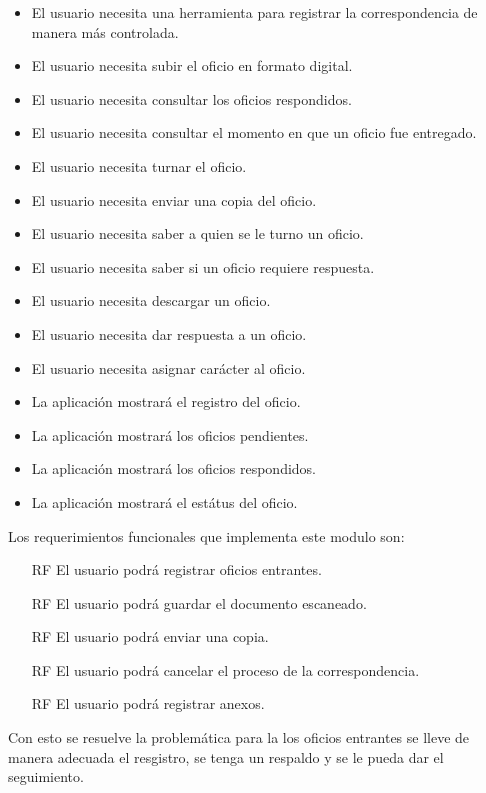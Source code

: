 \begin{itemize}
	\item El usuario necesita una herramienta para registrar la correspondencia de manera más controlada.
	\item El usuario necesita subir el oficio en formato digital.
	\item El usuario necesita consultar los oficios respondidos.
	\item El usuario necesita consultar el momento en que un oficio fue entregado.
	\item El usuario necesita turnar el oficio.
	\item El usuario necesita enviar una copia del oficio.
	\item El usuario necesita saber a quien se le turno un oficio.
	\item El usuario necesita saber si un oficio requiere respuesta.
	\item El usuario necesita descargar un oficio.
	\item El usuario necesita dar respuesta a un oficio.
	\item El usuario necesita asignar carácter al oficio.
	\item La aplicación mostrará el registro del oficio.
	\item La aplicación mostrará los oficios pendientes.
	\item La aplicación mostrará los oficios respondidos.
	\item La aplicación mostrará el estátus del oficio.
\end{itemize}

Los requerimientos funcionales que implementa este modulo son: 

\begin{itemize}
	\item[RF] El usuario podrá registrar oficios entrantes.
	\item[RF] El usuario podrá guardar el documento escaneado.
	\item[RF] El usuario podrá enviar una copia.
	\item[RF] El usuario podrá cancelar el proceso de la correspondencia.
	\item[RF] El usuario podrá registrar anexos.
\end{itemize}

Con esto se resuelve la problemática para la los oficios entrantes se lleve de manera adecuada el resgistro, se tenga un respaldo y se le pueda dar el seguimiento. 

